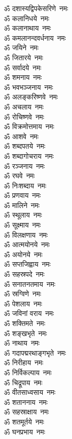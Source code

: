 \begin{multicols}{2}
\begin{flushleft}
ॐ दशास्यद्विपकेसरिणे~नमः\\
ॐ कलानिधये~नमः\\
ॐ कलानाथाय~नमः\\
ॐ कमलानन्दवर्धनाय~नमः\\
ॐ जयिने~नमः\hfill{}\\
ॐ जितारये~नमः\\
ॐ सर्वादये~नमः\\
ॐ शमनाय~नमः\\
ॐ भवभञ्जनाय~नमः\\
ॐ अलङ्करिष्णवे~नमः\\
ॐ अचलाय~नमः\\
ॐ रोचिष्णवे~नमः\\
ॐ विक्रमोत्तमाय~नमः\\
ॐ आशवे~नमः\\
ॐ शब्दपतये~नमः\hfill{}\\
ॐ शब्दागोचराय~नमः\\
ॐ रञ्जनाय~नमः\\
ॐ रघवे~नमः\\
ॐ निःशब्दाय~नमः\\
ॐ प्रणवाय~नमः\\
ॐ मालिने~नमः\\
ॐ स्थूलाय~नमः\\
ॐ सूक्ष्माय~नमः\\
ॐ विलक्षणाय~नमः\\
ॐ आत्मयोनये~नमः\hfill{}\\
ॐ अयोनये~नमः\\
ॐ सप्तजिह्वाय~नमः\\
ॐ सहस्रपदे~नमः\\
ॐ सनातनतमाय~नमः\\
ॐ स्रग्विणे~नमः\\
ॐ पेशलाय~नमः\\
ॐ जविनां वराय~नमः\\
ॐ शक्तिमते~नमः\\
ॐ शङ्खभृते~नमः\\
ॐ नाथाय~नमः\hfill{}\\
ॐ गदापद्मरथाङ्गभृते~नमः\\
ॐ निरीहाय~नमः\\
ॐ निर्विकल्पाय~नमः\\
ॐ चिद्रूपाय~नमः\\
ॐ वीतसाध्वसाय~नमः\\
ॐ शताननाय~नमः\\
ॐ सहस्राक्षाय~नमः\\
ॐ शतमूर्तये~नमः\\
ॐ घनप्रभाय~नमः\\

\end{flushleft}
\end{multicols}
